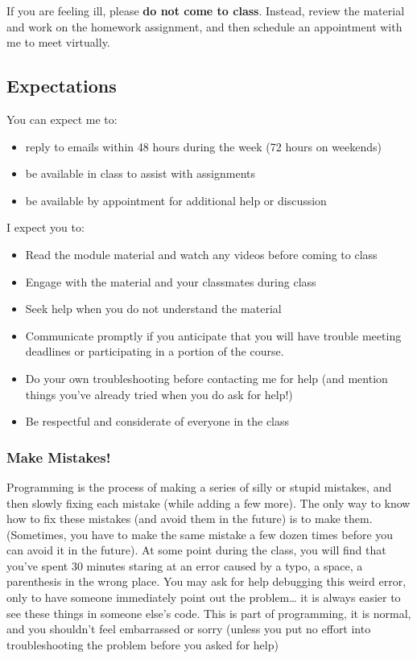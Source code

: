 \documentclass[
  11pt,
  letterpaper,
  DIV=11,
  numbers=noendperiod]{scrartcl}
\providecommand{\tightlist}{%
  \setlength{\itemsep}{0pt}\setlength{\parskip}{0pt}}\usepackage{longtable,booktabs,array}
\begin{document}
If you are feeling ill, please \textbf{do not come to class}. Instead,
review the material and work on the homework assignment, and then
schedule an appointment with me to meet virtually.

\hypertarget{expectations}{%
\subsection{Expectations}\label{expectations}}

You can expect me to:

\begin{itemize}
\tightlist
\item
  reply to emails within 48 hours during the week (72 hours on weekends)
\item
  be available in class to assist with assignments
\item
  be available by appointment for additional help or discussion
\end{itemize}

I expect you to:

\begin{itemize}
\tightlist
\item
  Read the module material and watch any videos before coming to class
\item
  Engage with the material and your classmates during class
\item
  Seek help when you do not understand the material
\item
  Communicate promptly if you anticipate that you will have trouble
  meeting deadlines or participating in a portion of the course.
\item
  Do your own troubleshooting before contacting me for help (and mention
  things you've already tried when you do ask for help!)
\item
  Be respectful and considerate of everyone in the class
\end{itemize}

\hypertarget{make-mistakes}{%
\subsubsection{Make Mistakes!}\label{make-mistakes}}

Programming is the process of making a series of silly or stupid
mistakes, and then slowly fixing each mistake (while adding a few more).
The only way to know how to fix these mistakes (and avoid them in the
future) is to make them. (Sometimes, you have to make the same mistake a
few dozen times before you can avoid it in the future). At some point
during the class, you will find that you've spent 30 minutes staring at
an error caused by a typo, a space, a parenthesis in the wrong place.
You may ask for help debugging this weird error, only to have someone
immediately point out the problem\ldots{} it is always easier to see
these things in someone else's code. This is part of programming, it is
normal, and you shouldn't feel embarrassed or sorry (unless you put no
effort into troubleshooting the problem before you asked for help)
\end{document}
